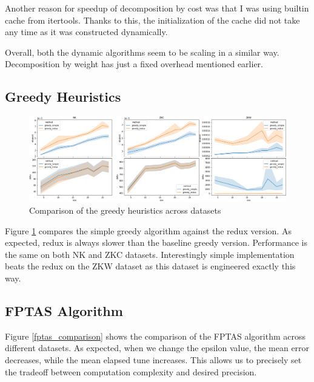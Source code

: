 \documentclass[a4paper,10pt]{article}
\begin{document}
Another reason for speedup of decomposition by cost was that I was using builtin cache from itertools. Thanks to this, the initialization of the cache did not take any time as it was constructed dynamically.

Overall, both the dynamic algorithms seem to be scaling in a similar way.  Decomposition by weight has just a fixed overhead mentioned earlier.

\subsection{Greedy Heuristics}

\begin{figure}[!htb]
	\centering
  	\includegraphics[width=\textwidth]{images/greedy_comparison_datasets.png}
	\caption{Comparison of the greedy heuristics across datasets}
	\label{greedy_comparison_datasets}
\end{figure}

Figure \ref{greedy_comparison_datasets} compares the simple greedy algorithm against the redux version. As expected, redux is always slower than the baseline greedy version. Performance is the same on both NK and ZKC datasets. Interestingly simple implementation beats the redux on the ZKW dataset as this dataset is engineered exactly this way.

\subsection{FPTAS Algorithm}


Figure \ref{fptas_comparison} shows the comparison of the FPTAS algorithm across different datasets. As expected, when we change the epsilon value, the mean error decreases, while the mean elapsed tune increases. This allows us to precisely set the tradeoff between computation complexity and desired precision.
\end{document}
